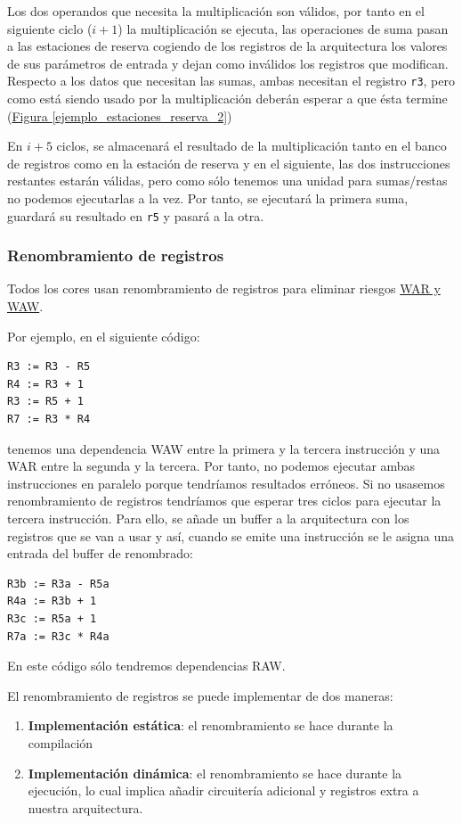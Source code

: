 \documentclass[10pt,a4paper,spanish]{report}
\begin{document}
Los dos operandos que necesita la multiplicación son válidos, por tanto en el siguiente ciclo ($i+1$) la multiplicación se ejecuta, las operaciones de suma pasan a las estaciones de reserva cogiendo de los registros de la arquitectura los valores de sus parámetros de entrada y dejan como inválidos los registros que modifican. Respecto a los datos que necesitan las sumas, ambas necesitan el registro \verb*|r3|, pero como está siendo usado por la multiplicación deberán esperar a que ésta termine (\hyperref[ejemplo_estaciones_reserva_2]{Figura \ref*{ejemplo_estaciones_reserva_2}})

En $i+5$ ciclos, se almacenará el resultado de la multiplicación tanto en el banco de registros como en la estación de reserva y en el siguiente, las dos instrucciones restantes estarán válidas, pero como sólo tenemos una unidad para sumas/restas no podemos ejecutarlas a la vez. Por tanto, se ejecutará la primera suma, guardará su resultado en \verb*|r5| y pasará a la otra.

\textcolor{azul}{\subsubsection{Renombramiento de registros}}
Todos los cores usan renombramiento de registros para eliminar riesgos \hyperref[dependencias_de_datos]{WAR y WAW}.

Por ejemplo, en el siguiente código:

\begin{verbatim}
R3 := R3 - R5
R4 := R3 + 1
R3 := R5 + 1
R7 := R3 * R4
\end{verbatim}

tenemos una dependencia WAW entre la primera y la tercera instrucción y una WAR entre la segunda y la tercera. Por tanto, no podemos ejecutar ambas instrucciones en paralelo porque tendríamos resultados erróneos. Si no usasemos renombramiento de registros tendríamos que esperar tres ciclos para ejecutar la tercera instrucción. Para ello, se añade un buffer a la arquitectura con los registros que se van a usar y así, cuando se emite una instrucción se le asigna una entrada del buffer de renombrado:

\begin{verbatim}
R3b := R3a - R5a
R4a := R3b + 1
R3c := R5a + 1
R7a := R3c * R4a
\end{verbatim}

En este código sólo tendremos dependencias RAW.

El renombramiento de registros se puede implementar de dos maneras:
\begin{enumerate}[\color{azul}{$\heartsuit$}]
    \item \textbf{\textcolor{azul}{Implementación estática}}: el renombramiento se hace durante la compilación
    \item \textbf{\textcolor{azul}{Implementación dinámica}}: el renombramiento se hace durante la ejecución, lo cual implica añadir circuitería adicional y registros extra a nuestra arquitectura.
\end{enumerate}
\end{document}
